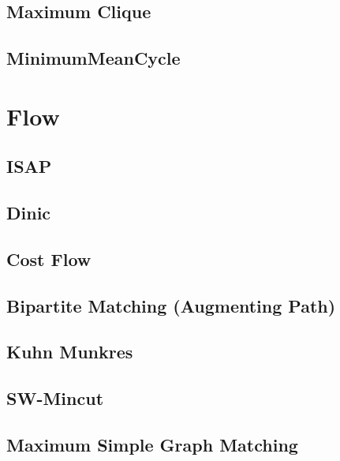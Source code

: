 \documentclass[10pt,twocolumn,oneside]{article}
\begin{document}
\subsection{Maximum Clique}


\subsection{MinimumMeanCycle}


\section{Flow}
\subsection{ISAP} %


\subsection{Dinic} %


\subsection{Cost Flow} %


\subsection{Bipartite Matching (Augmenting Path)}


\subsection{Kuhn Munkres}


\subsection{SW-Mincut}


\subsection{Maximum Simple Graph Matching}

\end{document}
